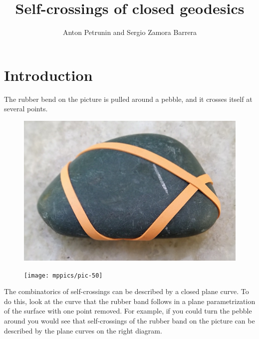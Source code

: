 \documentclass[oneside,a4paper]{amsart}
\begin{document}


\title{Self-crossings of closed geodesics}
\author{Anton Petrunin and Sergio Zamora Barrera}

\maketitle

\section{Introduction}


The rubber bend on the picture is pulled around a pebble,
and it crosses itself at several points.
\begin{figure}[!ht]
\begin{minipage}{.64\textwidth}
\centering
\includegraphics[width=\textwidth]{pics/pebble.jpg}
\end{minipage}\hfill
\begin{minipage}{.34\textwidth}
\centering
\texttt{[image: mppics/pic-50]}
\end{minipage}
\end{figure}
The combinatorics of self-crossings can be described by a closed plane curve.
To do this, look at the curve that the rubber band follows in a plane parametrization of the surface with one point removed.
For example, if you could turn the pebble around you would see that self-crossings of the rubber band on the picture can be described by the plane curves on the right diagram.
\end{document}
